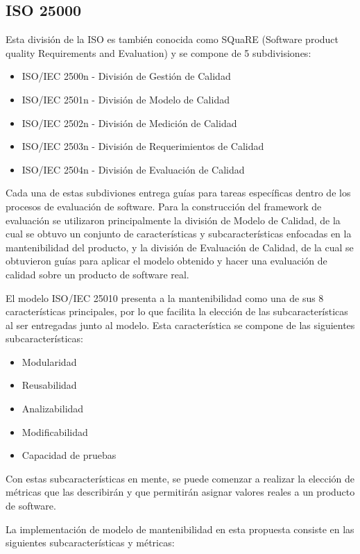 \documentclass[letterpaper]{article}
\begin{document}
\subsection{ISO 25000}
Esta división de la ISO es también conocida como SQuaRE (Software product
quality Requirements and Evaluation) y se compone de 5 subdivisiones:
\begin{itemize}
    \item ISO/IEC 2500n - División de Gestión de Calidad
    \item ISO/IEC 2501n - División de Modelo de Calidad
    \item ISO/IEC 2502n - División de Medición de Calidad
    \item ISO/IEC 2503n - División de Requerimientos de Calidad
    \item ISO/IEC 2504n - División de Evaluación de Calidad
\end{itemize}

Cada una de estas subdiviones entrega guías para tareas específicas dentro
de los procesos de evaluación de software. 
Para la construcción del framework de evaluación se utilizaron 
principalmente la división de Modelo de Calidad, de la cual
se obtuvo un conjunto de características  y subcaracterísticas enfocadas en la mantenibilidad del 
producto, y la división de Evaluación de Calidad, de la cual se obtuvieron
guías para aplicar el modelo obtenido y hacer una evaluación de calidad
sobre un producto de software real.

El modelo ISO/IEC 25010 presenta a la mantenibilidad como una de sus 8 características
principales, por lo que facilita la elección de las subcaracterísticas al ser
entregadas junto al modelo. 
Esta característica se compone de las siguientes subcaracterísticas:

\begin{itemize}
	\item Modularidad
	\item Reusabilidad
	\item Analizabilidad
	\item Modificabilidad
	\item Capacidad de pruebas
\end{itemize}

Con estas subcaracterísticas en mente, se puede comenzar a realizar la elección
de métricas que las describirán y que permitirán asignar valores reales a un 
producto de software. 

La implementación de modelo de mantenibilidad en esta propuesta consiste en
las siguientes subcaracterísticas y métricas:
\end{document}
